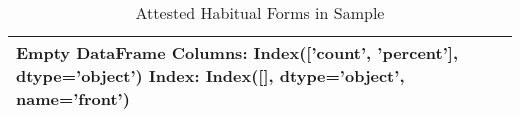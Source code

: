 \begin{table}[htbp!]
\centering
\caption{Attested Habitual Forms in Sample}
\label{table:hab_front}
\begin{tabular}{lrl}
\toprule
Empty DataFrame
Columns: Index(['count', 'percent'], dtype='object')
Index: Index([], dtype='object', name='front') \\
\bottomrule
\end{tabular}
\end{table}
